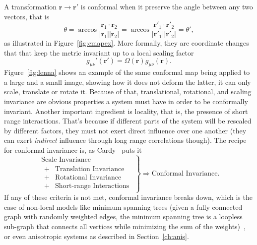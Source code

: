 A transformation $\mathbf{r}\rightarrow\mathbf{r}'$ is conformal when it
preserve the angle between any two vectors, that is
\begin{equation}
    \theta=
    \arccos\frac{\mathbf{r}_{1}\cdot\mathbf{r}_{2}}
                {\left|\mathbf{r}_{1}\right|\left|\mathbf{r}_{2}\right|}=
    \arccos\frac{\mathbf{r}'_{1}\cdot\mathbf{r}'_{2}}
                {\left|\mathbf{r}'_{1}\right|\left|\mathbf{r}'_{2}\right|}=
    \theta',
\end{equation}
as illustrated in Figure~\ref{fig:cmapex}. More formally, they are coordinate
changes that that keep the metric invariant up to a local scaling factor
\begin{equation}
    g_{\mu\nu}'\left(\mathbf{r}'\right)=
    \Omega\left(\mathbf{r}\right)g_{\mu\nu}\left(\mathbf{r}\right).
\end{equation}
Figure~\ref{fig:lenna} shows an example of the same conformal map being applied
to a large and a small image, showing how it does not deform the latter, it can
only scale, translate or rotate it. Because of that, translational, rotational,
and scaling invariance are obvious properties a system must have in order to be
conformally invariant. Another important ingredient is locality, that is, the
presence of short range interactions. That's because if different parts of the
system will be rescaled by different factors, they must not exert direct
influence over one another (they can exert \textit{indirect} influence through
long range correlations though). The recipe for conformal invariance is, as
Cardy~\cite{Domb1972} puts it
\begin{equation*}
    \left.
        \begin{array}{l}
            \mbox{Scale Invariance}\\
            \begin{array}{cl}
                + & \mbox{Translation Invariance}\\
                + & \mbox{Rotational Invariance}\\
                + & \mbox{Short-range Interactions}
            \end{array}
        \end{array}
    \right\} \Rightarrow\mbox{Conformal Invariance}.
\end{equation*}
If any of these criteria is not met, conformal invariance breaks down, which is
the case of non-local models like minimum spanning trees (given a fully
connected graph with randomly weighted edges, the minimum spanning tree is a
loopless sub-graph that connects all vertices while minimizing the sum of the
weights)~\cite{Wilson2004}, or even anisotropic systems as described in
Section~\ref{ch:anis}.

